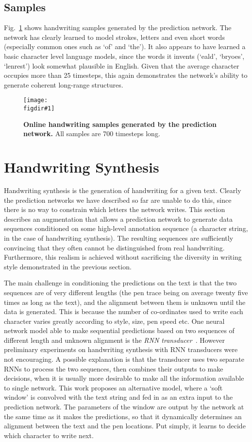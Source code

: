\documentclass{article}
\newcommand{\flabel}[1]{\label{fig:#1}}
\newcommand{\seclabel}[1]{\label{sec:#1}}
\newcommand{\fref}[1]{Fig.~\ref{fig:#1}}
\newcommand{\figdir}{}
\newcommand{\capt}[2]{\caption[#1]{\textbf{#1}#2}}
\newcommand{\fig}[5]
{
\begin{figure}
\begin{center}
\texttt{[image: \\figdir\#1]}
\end{center}
\capt{#4}{#5}
\flabel{#2}
\end{figure}
}
\begin{document}
\subsection{Samples}

\fref{pred_handwriting} shows handwriting samples generated by the prediction network.
The network has clearly learned to model strokes, letters and even short words (especially common ones such as `of' and `the').
It also appears to have learned a basic character level language models, since the words it invents (`eald', `bryoes', `lenrest') look somewhat plausible in English.
Given that the average character occupies more than 25 timesteps, this again demonstrates the network's ability to generate coherent long-range structures.

\fig{pred}{pred_handwriting}{1}{Online handwriting samples generated by the prediction network.}{ All samples are 700 timesteps long.
}

\section{Handwriting Synthesis}
\seclabel{hand_synth}
Handwriting synthesis is the generation of handwriting for a given text.
Clearly the prediction networks we have described so far are unable to do this, since there is no way to constrain which letters the network writes.
This section describes an augmentation that allows a prediction network to generate data sequences conditioned on some high-level annotation sequence (a character string, in the case of handwriting synthesis).
The resulting sequences are sufficiently convincing that they often cannot be distinguished from real handwriting.
Furthermore, this realism is achieved without sacrificing the diversity in writing style demonstrated in the previous section.

The main challenge in conditioning the predictions on the text is that the two sequences are of very different lengths (the pen trace being on average twenty five times as long as the text), and the alignment between them is unknown until the data is generated.
This is because the number of co-ordinates used to write each character varies greatly according to style, size, pen speed etc.
One neural network model able to make sequential predictions based on two sequences of different length and unknown alignment is the \emph{RNN transducer}~\cite{graves12transducer}.
However preliminary experiments on handwriting synthesis with RNN transducers were not encouraging.
A possible explanation is that the transducer uses two separate RNNs to process the two sequences, then combines their outputs to make decisions, when it is usually more desirable to make all the information available to single network.
This work proposes an alternative model, where a `soft window' is convolved with the text string and fed in as an extra input to the prediction network.
The parameters of the window are output by the network at the same time as it makes the predictions, so that it dynamically determines an alignment between the text and the pen locations.
Put simply, it learns to decide which character to write next.
\end{document}
